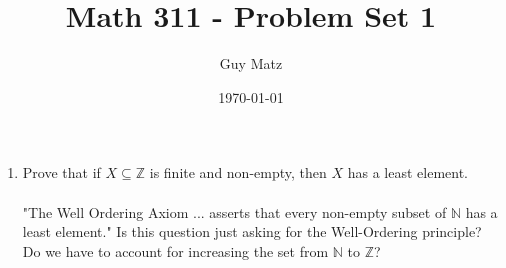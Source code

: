 \documentclass[11pt]{article}
\title{\textbf{Math 311 - Problem Set 1}}
\author{Guy Matz}
\date{\today}
\begin{document}


\begin{enumerate}  %
\item Prove that if $X \subseteq \mathbb{Z}$ is finite and non-empty, then $X$ has a least element.\\
\\
"The Well Ordering Axiom ... asserts that every non-empty subset of $\mathbb{N}$ has a least element."  Is this question just asking for the Well-Ordering principle?  Do we have to account for increasing the set from $\mathbb{N}$ to $\mathbb{Z}$?
\end{enumerate} %
\end{document}

